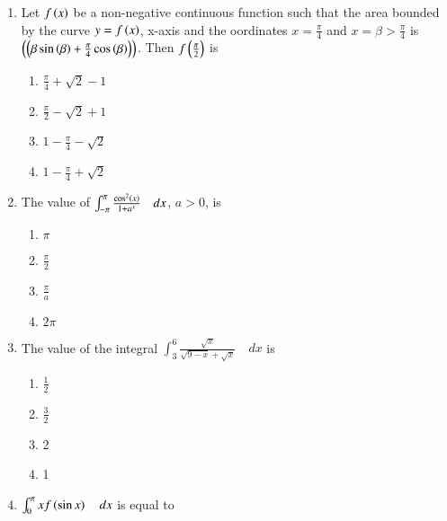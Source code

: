 \documentclass[journal]{IEEEtran}
\begin{document}
\begin{enumerate}
	     \item 
		      Let $f\left(x\right)$ be a non-negative continuous function such that the area bounded by the curve $y=f\left(x\right)$, x-axis and the oordinates $x=\frac{\pi}{4}$ and $x=\beta>\frac{\pi}{4}$ is $\left(\left(\beta \sin\left(\beta\right)+\frac{\pi}{4}\cos\left(\beta\right)\right)\right)$. Then $f\left(\frac{\pi}{2}\right)$ is
		     \hfill {}
		     \begin{enumerate}
		            \item $\frac{\pi}{4}+\sqrt{2}-1$
		            \item $\frac{\pi}{2}-\sqrt{2}+1$
		            \item $1-\frac{\pi}{4}-\sqrt{2}$
		            \item $1-\frac{\pi}{4}+\sqrt{2}$
		     \end{enumerate}
	     \item 
		      The value of $\int_{-\pi}^{\pi} \frac{\cos^{2}\left(x\right)}{1+a^{x}} \quad dx$, $a>0$, is
		     \hfill {}
		     \begin{enumerate}
		           \item $\pi$
		           \item $\frac{\pi}{2}$
		           \item $\frac{\pi}{a}$
		           \item $2\pi$
		     \end{enumerate}
	     \item 
		     The value of the integral $\int_{3}^{6} \frac{\sqrt{x}}{\sqrt{9-x}+\sqrt{x}} \quad dx$ is \quad \quad \quad
       \quad \quad
		     \hfill {} 
		    \begin{enumerate}
		     
		          \item $\frac{1}{2}$
		          \item $\frac{3}{2}$
		          \item 2
		          \item 1
		    \end{enumerate}
	     \item 
		     $\int_{0}^{\pi} xf\left(\sin x\right) \quad dx$ is equal to 
		    \hfill {}
		    \begin{enumerate}
		    

\end{enumerate}
\end{enumerate}
\end{document}
